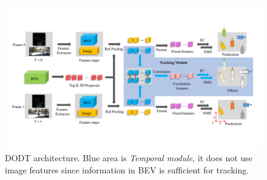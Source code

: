 \documentclass[a4paper, 10pt, conference]{ieeeconf}      %
\begin{document}


\begin{figure}
	\vspace{-0.6cm}
	\rule{0pt}{1ex}
	\begin{center}
		\includegraphics[trim={0.5cm, 3cm, 0.5cm, 3cm}, clip, width=\textwidth]{images/structure.pdf}
	\end{center}
	\caption{DODT architecture. Blue area is \textit{Temporal module}, it does not use image features since information in BEV is sufficient for tracking.}
	\label{fig:dodt}
	\vspace{-0.5cm}
\end{figure}
\end{document}
